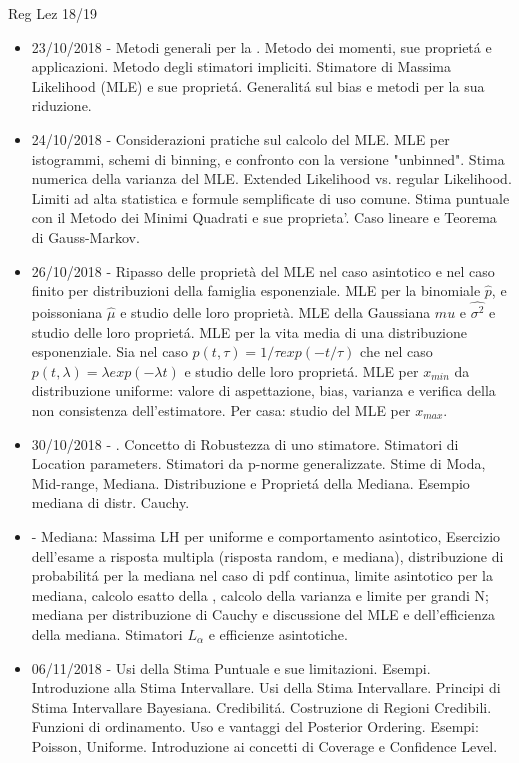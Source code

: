\begin{frame}[allowframebreaks]{Reg Lez 18/19}
\begin{itemize}
\item 23/10/2018 - Metodi generali per la . Metodo dei momenti, sue propriet\'a e applicazioni. Metodo degli stimatori impliciti. Stimatore di Massima Likelihood (MLE) e sue propriet\'a. Generalit\'a sul bias e metodi per la sua riduzione.
\item 24/10/2018 - Considerazioni pratiche sul calcolo del MLE. MLE per istogrammi, schemi di binning, e confronto con la versione "unbinned". Stima numerica della varianza del MLE. Extended Likelihood vs. regular Likelihood. Limiti ad alta statistica e formule semplificate di uso comune. Stima puntuale con il Metodo dei Minimi Quadrati e sue proprieta'. Caso lineare e Teorema di Gauss-Markov.
\item 26/10/2018 - Ripasso delle proprietà del MLE nel caso asintotico e nel caso finito per distribuzioni della famiglia esponenziale. MLE per la binomiale $\hat{p}$, e poissoniana $\hat{\mu}$ e studio delle loro proprietà. MLE della Gaussiana $\hat{mu}$ e $\hat{\sigma^2}$ e studio delle loro propriet\'a. MLE per la vita media di una distribuzione esponenziale. Sia nel caso $p(t,\tau)=1/\tau exp(-t/\tau)$ che nel caso $p(t,\lambda)=\lambda exp(-\lambda t)$ e studio delle loro propriet\'a. MLE per $x_{min}$ da distribuzione uniforme: valore di aspettazione, bias, varianza e verifica della non consistenza dell'estimatore. Per casa: studio del MLE per $x_{max}$.
\item 30/10/2018 - . Concetto di Robustezza di uno stimatore. Stimatori di Location parameters. Stimatori da p-norme generalizzate. Stime di Moda, Mid-range, Mediana. Distribuzione e Propriet\'a della Mediana. Esempio mediana di distr. Cauchy.
\item {} - Mediana: Massima LH per uniforme e comportamento asintotico, Esercizio dell'esame a risposta multipla (risposta random, e mediana), distribuzione di probabilit\'a per la mediana nel caso di pdf continua, limite asintotico per la mediana, calcolo esatto della , calcolo della varianza e limite per grandi N; mediana per distribuzione di Cauchy e discussione del MLE e dell'efficienza della mediana. Stimatori $L_{\alpha}$ e efficienze asintotiche.
\item 06/11/2018 - Usi della Stima Puntuale e sue limitazioni. Esempi. Introduzione alla Stima Intervallare. Usi della Stima Intervallare. Principi di Stima Intervallare Bayesiana. Credibilit\'a. Costruzione di Regioni Credibili. Funzioni di ordinamento. Uso e vantaggi del Posterior Ordering. Esempi: Poisson, Uniforme. Introduzione ai concetti di Coverage e Confidence Level.

\end{itemize}
\end{frame}
